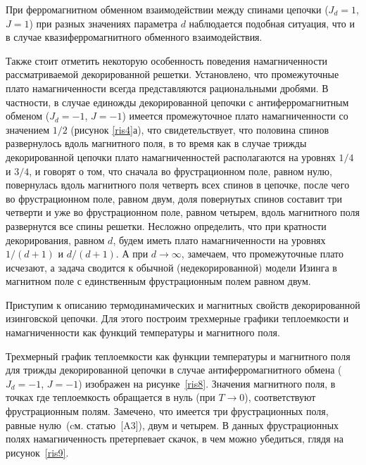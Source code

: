 При ферромагнитном обменном взаимодействии между спинами цепочки ($J_d=1$, $J=1$) при разных значениях параметра $d$ наблюдается подобная ситуация, что и в случае квазиферромагнитного обменного взаимодействия.

Также стоит отметить некоторую особенность поведения намагниченности рассматриваемой декорированной решетки. Установлено, что промежуточные плато намагниченности всегда представляются рациональными дробями. В частности, в случае единожды декорированной цепочки с антиферромагнитным обменом ($J_d=-1$, $J=-1$) имеется промежуточное плато намагниченности со значением $1/2$ (рисунок \ref{ris4}а), что свидетельствует, что половина спинов развернулось вдоль магнитного поля, в то время как в случае трижды декорированной цепочки плато намагниченностей располагаются на уровнях $1/4$ и $3/4$, и говорят о том, что сначала во фрустрационном поле, равном нулю, повернулась вдоль магнитного поля четверть всех спинов в цепочке, после чего во фрустрационном поле, равном двум, доля повернутых спинов составит три четверти и уже во фрустрационном поле, равном четырем, вдоль магнитного поля развернутся все спины решетки. Несложно определить, что при кратности декорирования, равном $d$, будем иметь плато намагниченности на уровнях $1/(d+1)$ и $d/(d+1)$. А при $d \rightarrow \infty$, замечаем, что промежуточные плато исчезают, а задача сводится к обычной (недекорированной) модели Изинга в магнитном поле с единственным фрустрационным полем равном двум.


Приступим к описанию термодинамических и магнитных свойств декорированной изинговской цепочки. Для этого построим трехмерные графики теплоемкости и намагниченности как функций температуры и магнитного поля.

Трехмерный график теплоемкости как функции температуры и магнитного поля для трижды декорированной цепочки в случае антиферромагнитного обмена ($J_d=-1$, $J=-1$) изображен на рисунке~\ref{ris8}. Значения магнитного поля, в точках где теплоемкость обращается в нуль (при $T\rightarrow 0$), соответствуют фрустрационным полям. Замечено, что имеется три фрустрационных поля, равные нулю~(cм. статью~[A3]), двум и четырем. В данных фрустрационных полях намагниченность претерпевает скачок, в чем можно убедиться, глядя на рисунок~\ref{ris9}.


